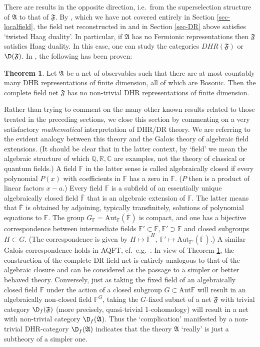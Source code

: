 \documentclass[12pt]{article}
\newcommand{\alg}[1]{\mathfrak{#1}}
\theoremstyle{definition}
\newtheorem{thm}{Theorem}[section]
\theoremstyle{definition}
\theoremstyle{remark}
\def\7#1{{\mathbb #1}}
\newcommand{\Aut}{\mathrm{Aut}}
\begin{document}
There are results in the opposite direction, i.e.\ from
the superselection structure of $\alg{A}$ to that of
$\alg{F}$. By \cite[Theorem 3.6]{dr2}, which we have
not covered entirely in Section \ref{sec-localfield},
the field net reconstructed in \cite{dr2} and in
Section \ref{sec-DR} above satisfies `twisted Haag
duality'. In particular, if $\alg{A}$ has no Fermionic
representations then $\alg{F}$ satisfies Haag
duality. In this case, one can study the categories
$DHR(\alg{F})$ or $\D(\alg{F})$. In \cite{CDR}, the
following has been proven:

\begin{thm} \label{thm-cdr} Let $\alg{A}$ be a net of
  observables such that there are at most countably
  many DHR representations of finite dimension, all of
  which are Bosonic. Then the complete field net
  $\alg{F}$ has no non-trivial DHR representations of
  finite dimension.
\end{thm}

Rather than trying to comment on the many other known
results related to those treated in the preceding
sections, we close this section by commenting on a very
satisfactory {\it mathematical} interpretation of
DHR/DR theory. We are referring to the evident analogy
between this theory and the Galois theory of algebraic
field extensions. (It should be clear that in the
latter context, by `field' we mean the algebraic
structure of which $\7Q,\7R,\7C$ are examples, not the
theory of classical or quantum fields.) A field $\7F$
in the latter sense is called algebraically closed if
every polynomial $P(x)$ with coefficients in $\7F$ has
a zero in $\7F$. ($P$ then is a product of linear
factors $x-a$.) Every field $\7F$ is a subfield of an
essentially unique algebraically closed field
$\overline{\7F}$ that is an algebraic extension of
$\7F$. The latter means that $\overline{\7F }$ is
obtained by adjoining, typically transfinitely,
solutions of polynomial equations to $\7F$. The group
$G_\7F=\Aut_\7F(\overline{\7F})$ is compact, and one
has a bijective correspondence between intermediate
fields $\7F'\subset\overline{\7F},\7F'\supset\7F$ and
closed subgroups $H\subset G$. (The correspondence is
given by $H\mapsto \overline{\7F}^H,\
\7F'\mapsto\Aut_{\7F'}(\overline{\7F})$.) A similar
Galois correspondence holds in AQFT, cf.\ e.g.\
\cite{CDR,carpi-conti}. In view of Theorem
\ref{thm-cdr}, the construction of the complete DR
field net is entirely analogous to that of the
algebraic closure and can be considered as the passage
to a simpler or better behaved theory. Conversely, just
as taking the fixed field of an algebraically closed
field $\7F$ under the action of a closed subgroup
$G\subset\Aut\7F$ will result in an algebraically
non-closed field $\7F^G$, taking the $G$-fixed subnet
of a net $\alg{F}$ with trivial category
$\D_f(\alg{F})$ (more precisely, quasi-trivial
1-cohomology) will result in a net with non-trivial
category $\D_f(\alg{A})$.  Thus the `complication'
manifested by a non-trivial DHR-category
$\D_f(\alg{A})$ indicates that the theory $\alg{A}$
`really' is just a subtheory of a simpler one.
\end{document}
